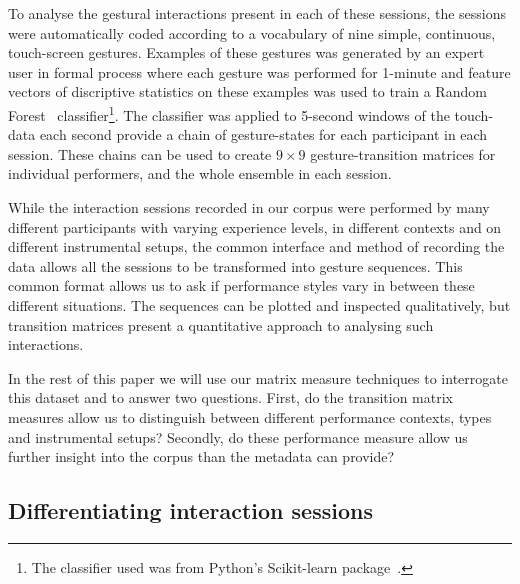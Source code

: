 \documentclass{sigchi}
\begin{document}

To analyse the gestural interactions present in each of these
sessions, the sessions were automatically coded according to a
vocabulary of nine simple, continuous, touch-screen gestures. Examples
of these gestures was generated by an expert user in formal process
where each gesture was performed for 1-minute and feature vectors of
discriptive statistics on these examples was used to train a Random
Forest~\cite{Breiman:2001kx} classifier\footnote{The classifier used
  was from Python's Scikit-learn package~\cite{scikit-learn}.}. The
classifier was applied to 5-second windows of the touch-data each
second provide a chain of gesture-states for each participant in each
session. These chains can be used to create $9 \times 9$
gesture-transition matrices for individual performers, and the whole
ensemble in each session.

While the interaction sessions recorded in our corpus were performed
by many different participants with varying experience levels, in
different contexts and on different instrumental setups, the common
interface and method of recording the data allows all the sessions to
be transformed into gesture sequences. This common format allows us to
ask if performance styles vary in between these different situations.
The sequences can be plotted and inspected qualitatively, but
transition matrices present a quantitative approach to analysing such
interactions.

In the rest of this paper we will use our matrix measure techniques to
interrogate this dataset and to answer two questions. First, do the
transition matrix measures allow us to distinguish between different
performance contexts, types and instrumental setups? Secondly, do
these performance measure allow us further insight into the corpus
than the metadata can provide?

\subsection{Differentiating interaction sessions}
\label{differentiating-interaction-sessions}
\end{document}

